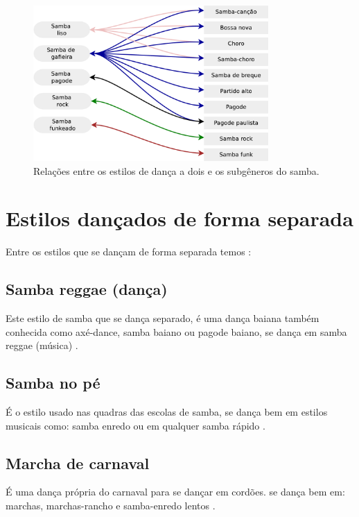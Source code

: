 \begin{figure}[h]
  \centering
    \includegraphics[width=0.8\textwidth]{chapters/cap-historia-dancasamba/dancavcmusica.eps}
  \caption{Relações entre os estilos de dança a dois e os subgêneros do samba.}
\label{fig:sambadavavsmusica}
\end{figure}

\section{Estilos dançados de forma separada}
Entre os estilos que se dançam de forma separada temos \cite[pp. 134]{perna2002samba}:

\subsection{Samba reggae  (dança)} 
Este estilo de samba que se dança separado, 
é uma dança baiana também conhecida como axé-dance, samba baiano ou pagode baiano,
se dança em samba reggae (música) \cite[pp. 134]{perna2002samba}.

\subsection{Samba no pé} 
É o estilo usado nas quadras das escolas de samba,
se dança bem em estilos musicais como: 
samba enredo ou em qualquer samba rápido  \cite[pp. 134]{perna2002samba}.

\subsection{Marcha de carnaval}
 É uma dança própria do carnaval para se dançar em cordões.
se dança bem em: marchas, marchas-rancho e samba-enredo lentos  \cite[pp. 135]{perna2002samba}.



